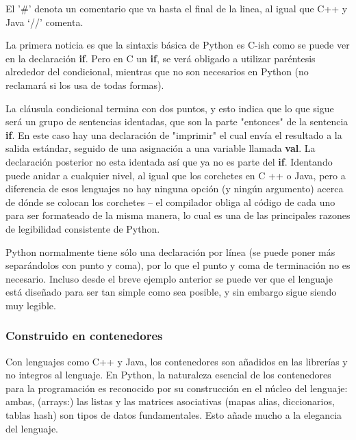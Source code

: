 El '\#' denota un comentario que va hasta el final de la linea, al igual que C++ y Java ‘//’ comenta. \newline

La primera noticia es que la sintaxis básica de Python es C-ish como se puede ver en la declaración \textbf{if}. Pero en C un \textbf{if}, se verá obligado a utilizar paréntesis alrededor del condicional,  mientras que no son necesarios en Python (no reclamará si los usa de todas formas).\newline

La cláusula condicional termina con dos puntos, y esto indica que lo que sigue será un grupo de sentencias identadas, que son la parte  "entonces" de la sentencia \textbf{if}. En este caso hay una declaración de "imprimir" el cual envía el resultado a la salida estándar, seguido de una asignación a una variable llamada \textbf{val}. La declaración posterior no esta identada así que ya no es parte del \textbf{if}. Identando puede anidar a cualquier nivel, al igual que los corchetes en C ++ o Java, pero a diferencia de esos lenguajes no hay ninguna opción (y ningún argumento) acerca de dónde se colocan los corchetes – el compilador obliga al código de cada uno para ser formateado de la misma manera, lo cual es una de las principales razones de legibilidad consistente de Python.     \newline

Python normalmente tiene sólo una declaración por línea (se puede poner más separándolos con punto y coma), por lo que el punto y coma de terminación no es necesario. Incluso desde el breve ejemplo anterior se puede ver que el lenguaje está diseñado para ser tan simple como sea posible, y sin embargo sigue siendo muy legible.



\subsubsection*{Construido en contenedores}
\label{subsubsec:cec}

Con lenguajes como C++ y Java, los contenedores son añadidos en las librerías y no integros al lenguaje. En Python, la naturaleza esencial de los contenedores para la programación es reconocido por su construcción en el núcleo del lenguaje: ambas, (arrays:) las listas y las matrices asociativas (mapas alias, diccionarios, tablas hash) son tipos de datos fundamentales. Esto añade mucho a la elegancia del lenguaje. \newline

